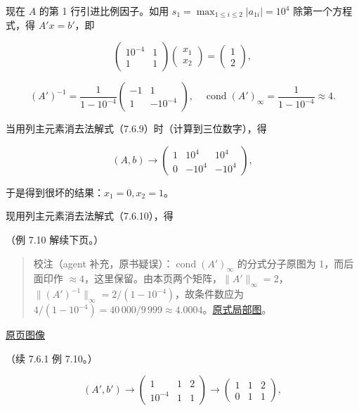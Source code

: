 \documentclass[
  10pt,
  fontset=fandol]{ctexart}
\begin{document}
现在 \(A\) 的第 1 行引进比例因子。如用 \(s_1=\max_{1\leqslant i\leqslant2}|a_{1i}|=10^4\) 除第一个方程式，得 \(A'x=b'\)，即

\[
\begin{pmatrix}10^{-4}&1\\1&1\end{pmatrix}
\begin{pmatrix}x_1\\x_2\end{pmatrix}
=\begin{pmatrix}1\\2\end{pmatrix},
\tag{7.6.10}
\]

\[
(A')^{-1}=\frac1{1-10^{-4}}\begin{pmatrix}-1&1\\1&-10^{-4}\end{pmatrix},\quad
\operatorname{cond}(A')_\infty=\frac1{1-10^{-4}}\approx4.
\]

当用列主元素消去法解式（7.6.9）时（计算到三位数字），得

\[
(A,b)\longrightarrow
\left(\begin{array}{cc|c}
1&10^4&10^4\\
0&-10^4&-10^4
\end{array}\right),
\]

于是得到很坏的结果：\(x_1=0,x_2=1\)。

现用列主元素消去法解式（7.6.10），得

（例 7.10 解续下页。）

\begin{quote}
校注（agent 补充，原书疑误）：\(\operatorname{cond}(A')_\infty\) 的分式分子原图为 1，而后面印作 \(\approx4\)，这里保留。由本页两个矩阵，\(\|A'\|_\infty=2\)，\(\|(A')^{-1}\|_\infty=2/(1-10^{-4})\)，故条件数应为 \(4/(1-10^{-4})=40\,000/9\,999\approx4.0004\)。\href{../assets/ch07b/209-scaled-cond.png}{原式局部图}。
\end{quote}

\href{../../source-images/pdf-210.jpeg}{原页图像}

（续 7.6.1 例 7.10。）

\[
(A',b')\longrightarrow
\left(\begin{array}{cc|c}1&1&2\\10^{-4}&1&1\end{array}\right)
\longrightarrow
\left(\begin{array}{cc|c}1&1&2\\0&1&1\end{array}\right),
\]
\end{document}
